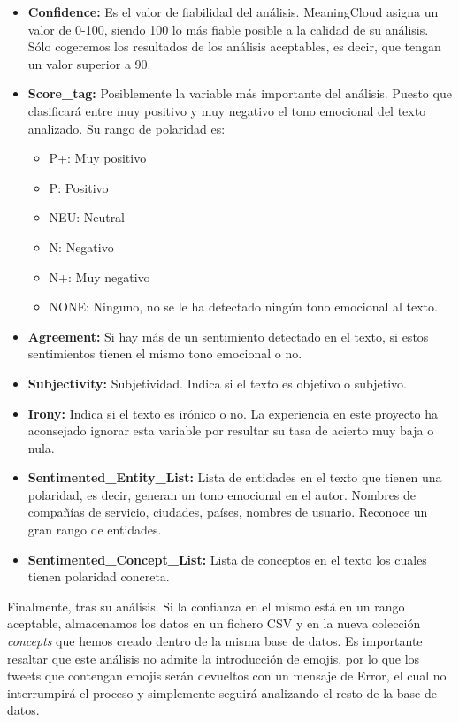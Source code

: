 \begin{itemize}
	\item \textbf{Confidence:} Es el valor de fiabilidad del análisis. MeaningCloud asigna un valor de 0-100, siendo 100 lo más fiable posible a la calidad de su análisis. Sólo cogeremos los resultados de los análisis aceptables, es decir, que tengan un valor superior a 90.
	\item \textbf{Score\_tag:} Posiblemente la variable más importante del análisis. Puesto que clasificará entre muy positivo y muy negativo el tono emocional del texto analizado. Su rango de polaridad es: 
	\begin{itemize}
		\item P+: Muy positivo
		\item P: Positivo
		\item NEU: Neutral
		\item N: Negativo
		\item N+: Muy negativo
		\item NONE: Ninguno, no se le ha detectado ningún tono emocional al texto.
	\end{itemize}
	\item \textbf{Agreement:} Si hay más de un sentimiento detectado en el texto, si estos sentimientos tienen el mismo tono emocional o no. 
	\item \textbf{Subjectivity:} Subjetividad. Indica si el texto es objetivo o subjetivo.
	\item \textbf{Irony:} Indica si el texto es irónico o no. La experiencia en este proyecto ha aconsejado ignorar esta variable por resultar su tasa de acierto muy baja o nula. 
	\item \textbf{Sentimented\_Entity\_List:} Lista de entidades en el texto que tienen una polaridad, es decir, generan un tono emocional en el autor. Nombres de compañías de servicio, ciudades, países, nombres de usuario. Reconoce un gran rango de entidades. 
	\item \textbf{Sentimented\_Concept\_List:} Lista de conceptos en el texto los cuales tienen polaridad concreta. 
\end{itemize}

Finalmente, tras su análisis. Si la confianza en el mismo está en un rango aceptable, almacenamos los datos en un fichero CSV y en la nueva colección \textit{concepts} que hemos creado dentro de la misma base de datos. Es importante resaltar que este análisis no admite la introducción de emojis, por lo que los tweets que contengan emojis serán devueltos con un mensaje de Error, el cual no interrumpirá el proceso y simplemente seguirá analizando el resto de la base de datos. 


